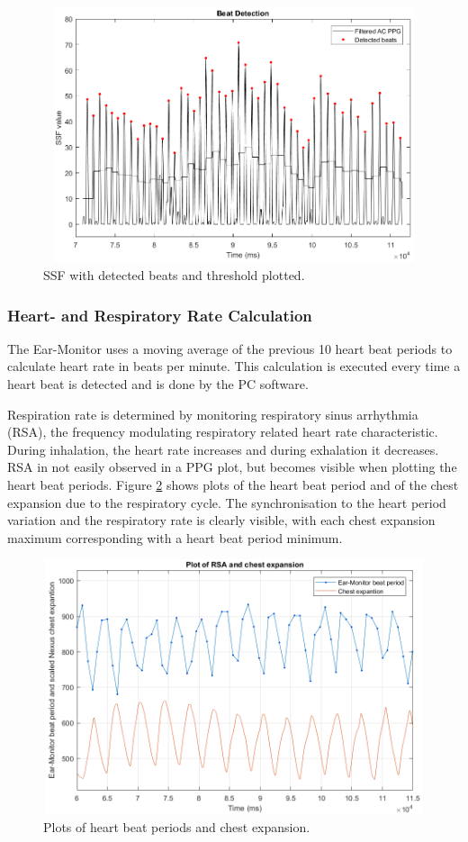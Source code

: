 \begin{figure}[H]
   \centering
   \includegraphics[width=12cm,height=7.5cm]{figs/BeatDetection.png}
   \caption{SSF with detected beats and threshold plotted.}
   \label{fig:BeatDetection}
\end{figure}

\subsubsection{Heart- and Respiratory Rate Calculation}
The Ear-Monitor uses a moving average of the previous 10 heart beat periods to calculate heart rate in beats per minute. This calculation is executed every time a heart beat is detected and is done by the PC software.

\medskip

Respiration rate is determined by monitoring respiratory sinus arrhythmia (RSA), the frequency modulating respiratory related heart rate characteristic. During inhalation, the heart rate increases and during exhalation it decreases. RSA in not easily observed in a PPG plot, but becomes visible when plotting the heart beat periods. Figure \ref{fig:RSA} shows plots of the heart beat period and of the chest expansion due to the respiratory cycle. The synchronisation to the heart period variation and the respiratory rate is clearly visible, with each chest expansion maximum corresponding with a heart beat period minimum.

\begin{figure}[H]
   \centering
   \includegraphics[width=12cm,height=7.5cm]{figs/RSA.png}
   \caption{Plots of heart beat periods and chest expansion.}
   \label{fig:RSA}
\end{figure}

